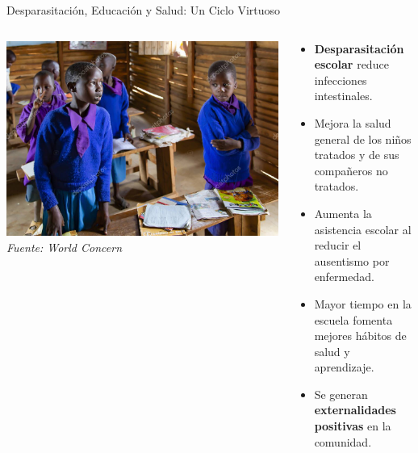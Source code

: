 \documentclass{beamer}
\begin{document}
\begin{frame}{Desparasitación, Educación y Salud: Un Ciclo Virtuoso}
    \small
    \begin{columns}
    \begin{column}{0.5\textwidth}
        \includegraphics[width=\linewidth]{../Figures/deworming_children.jpg}
        \tiny{\centering \textit{Fuente: World Concern}}
    \end{column}
    \begin{column}{0.5\textwidth}
        \begin{itemize}
        \item \textbf{Desparasitación escolar} reduce infecciones intestinales.
        \item Mejora la salud general de los niños tratados y de sus compañeros no tratados.
        \item Aumenta la asistencia escolar al reducir el ausentismo por enfermedad.
        \item Mayor tiempo en la escuela fomenta mejores hábitos de salud y aprendizaje.
        \item Se generan \textbf{externalidades positivas} en la comunidad.
        \end{itemize}
    \end{column}
    \end{columns}
\end{frame}
\end{document}
